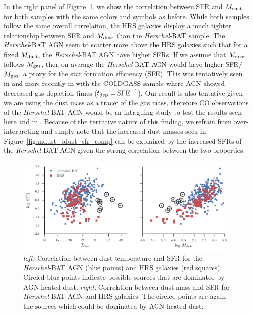 \documentclass[fleqn, usenatbib]{mnras}
\newcommand{\herschel}{\emph{Herschel}}
\newcommand{\mdust}{$M_{\rm dust}$}
\begin{document}
In the right panel of Figure~\ref{fig:sfr_tdust}, we show the correlation between SFR and \mdust{} for both samples with the same colors and symbols as before. While both samples follow the same overall correlation, the HRS galaxies display a much tighter relationship between SFR and \mdust{} than the \herschel-BAT sample. The \herschel-BAT AGN seem to scatter more above the HRS galaxies such that for a fixed \mdust, the \herschel-BAT AGN have higher SFRs. If we assume that \mdust{} follows $M_{\rm gas}$, then on average the \herschel-BAT AGN would have higher SFR/$M_{\rm gas}$, a proxy for the star formation efficiency (SFE). This was tentatively seen in \citet{Maiolino:1997vn} and more recently in \citet{Saintonge:2012uq} with the COLDGASS sample where AGN showed decreased gas depletion times ($t_{\rm dep} = \rm{SFE}^{-1}$). Our result is also tentative given we are using the dust mass as a tracer of the gas mass, therefore CO observations of the \herschel-BAT AGN would be an intriguing study to test the results seen here and in \citet{Saintonge:2012uq}. Because of the tentative nature of this finding, we refrain from over-interpreting and simply note that the increased dust masses seen in Figure~\ref{fig:mdust_tdust_sfr_comp} can be explained by the increased SFRs of the \herschel-BAT AGN given the strong correlation between the two properties.

\begin{figure}
\includegraphics[width=\textwidth]{figures/sfr_vs_tdust_and_mdust}
\caption{\textit{left:} Correlation between dust temperature and SFR for the \herschel-BAT AGN (blue points) and HRS galaxies (red squares). Circled blue points indicate possible sources that are dominated by AGN-heated dust. \textit{right:} Correlation between dust mass and SFR for \herschel-BAT AGN and HRS galaxies. The circled points are again the sources which could be dominated by AGN-heated dust. \label{fig:sfr_tdust}}
\end{figure}
\end{document}
